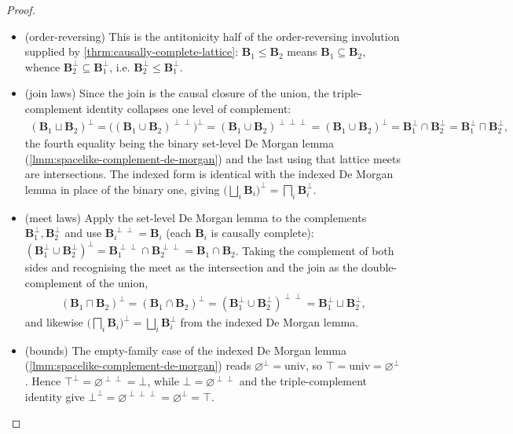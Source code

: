 \begin{proof}
    \begin{itemize}
        \item (order-reversing) This is the antitonicity half of the order-reversing involution supplied by \ref{thrm:causally-complete-lattice}: $\mathbf{B}_1 \le \mathbf{B}_2$ means $\mathbf{B}_1 \subseteq \mathbf{B}_2$, whence $\mathbf{B}_2^\perp \subseteq \mathbf{B}_1^\perp$, i.e. $\mathbf{B}_2^\perp \le \mathbf{B}_1^\perp$.
        \item (join laws) Since the join is the causal closure of the union, the triple-complement identity collapses one level of complement:
        \begin{align}
            (\mathbf{B}_1 \sqcup \mathbf{B}_2)^\perp = \bigl((\mathbf{B}_1 \cup \mathbf{B}_2)^{\perp\perp}\bigr)^\perp = (\mathbf{B}_1 \cup \mathbf{B}_2)^{\perp\perp\perp} = (\mathbf{B}_1 \cup \mathbf{B}_2)^\perp = \mathbf{B}_1^\perp \cap \mathbf{B}_2^\perp = \mathbf{B}_1^\perp \sqcap \mathbf{B}_2^\perp,
        \end{align}
        the fourth equality being the binary set-level De Morgan lemma (\ref{lmm:spacelike-complement-de-morgan}) and the last using that lattice meets are intersections. The indexed form is identical with the indexed De Morgan lemma in place of the binary one, giving $\bigl(\bigsqcup_i \mathbf{B}_i\bigr)^\perp = \bigsqcap_i \mathbf{B}_i^\perp$.
        \item (meet laws) Apply the set-level De Morgan lemma to the complements $\mathbf{B}_1^\perp, \mathbf{B}_2^\perp$ and use $\mathbf{B}_i^{\perp\perp} = \mathbf{B}_i$ (each $\mathbf{B}_i$ is causally complete): $(\mathbf{B}_1^\perp \cup \mathbf{B}_2^\perp)^\perp = \mathbf{B}_1^{\perp\perp} \cap \mathbf{B}_2^{\perp\perp} = \mathbf{B}_1 \cap \mathbf{B}_2$. Taking the complement of both sides and recognising the meet as the intersection and the join as the double-complement of the union,
        \begin{align}
            (\mathbf{B}_1 \sqcap \mathbf{B}_2)^\perp = (\mathbf{B}_1 \cap \mathbf{B}_2)^\perp = (\mathbf{B}_1^\perp \cup \mathbf{B}_2^\perp)^{\perp\perp} = \mathbf{B}_1^\perp \sqcup \mathbf{B}_2^\perp,
        \end{align}
        and likewise $\bigl(\bigsqcap_i \mathbf{B}_i\bigr)^\perp = \bigsqcup_i \mathbf{B}_i^\perp$ from the indexed De Morgan lemma.
        \item (bounds) The empty-family case of the indexed De Morgan lemma (\ref{lmm:spacelike-complement-de-morgan}) reads $\varnothing^\perp = \mathrm{univ}$, so $\top = \mathrm{univ} = \varnothing^\perp$. Hence $\top^\perp = \varnothing^{\perp\perp} = \bot$, while $\bot = \varnothing^{\perp\perp}$ and the triple-complement identity give $\bot^\perp = \varnothing^{\perp\perp\perp} = \varnothing^\perp = \top$.
    \end{itemize}


\end{proof}
